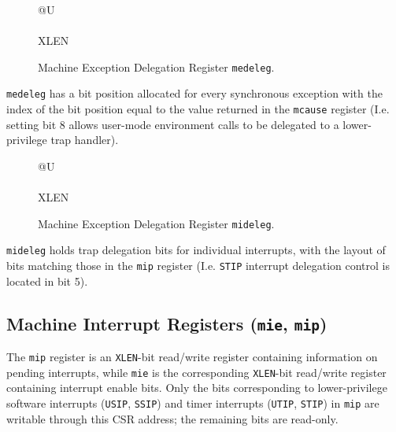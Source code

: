 \begin{figure}[h!]
	{\footnotesize
		\begin{center}
			\begin{tabular}{@{}U}
				 \\
				\hline
				 \\
				\hline
				XLEN \\
			\end{tabular}
		\end{center}
	}
	\vspace{-0.1in}
	\caption{Machine Exception Delegation Register {\tt medeleg}.}
	\label{fig:medelegreg}
\end{figure}

\texttt{medeleg} has a bit position allocated for every synchronous exception with the index of the bit position equal to the
value returned in the \texttt{mcause} register (I.e. setting bit 8 allows
user-mode environment calls to be delegated to a lower-privilege trap
handler). 

\begin{figure}[h!]
	{\footnotesize
		\begin{center}
			\begin{tabular}{@{}U}
				\instbitrange{XLEN-1}{0} \\
				\hline
				\multicolumn{1}{|c|}{Interrupts (\warl)} \\
				\hline
				XLEN \\
			\end{tabular}
		\end{center}
	}
	\vspace{-0.1in}
	\caption{Machine Exception Delegation Register {\tt mideleg}.}
	\label{fig:midelegreg}
\end{figure}

\texttt{mideleg} holds trap delegation bits for individual interrupts, with the
layout of bits matching those in the \texttt{mip} register (I.e. \texttt{STIP} interrupt
delegation control is located in bit 5).

\subsection{Machine Interrupt Registers (\texttt{mie},
\texttt{mip})}\label{machine-interrupt-registers-mie-mip}

The \texttt{mip} register is an \texttt{XLEN}-bit read/write register containing
information on pending interrupts, while \texttt{mie} is the corresponding
\texttt{XLEN}-bit read/write register containing interrupt enable bits. Only the
bits corresponding to lower-privilege software interrupts (\texttt{USIP}, \texttt{SSIP})
and timer interrupts (\texttt{UTIP}, \texttt{STIP}) in \texttt{mip} are writable through this CSR address; the remaining bits are read-only.

